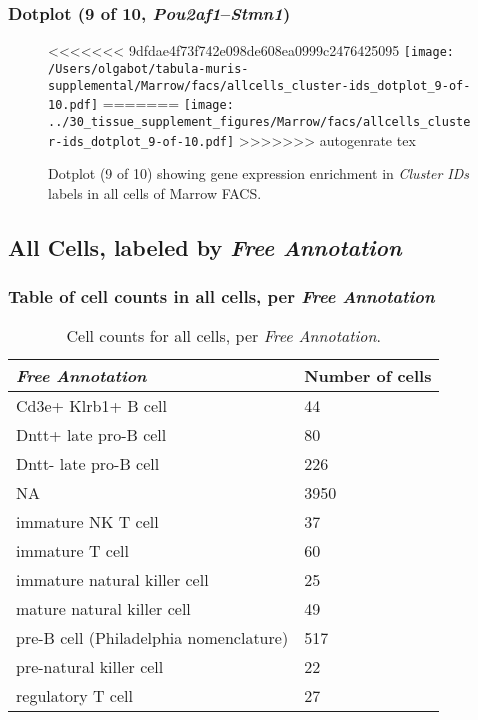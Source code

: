 \clearpage

\subsubsection{Dotplot (9 of 10, \emph{Pou2af1}--\emph{Stmn1})}
\begin{figure}[h]
\centering
<<<<<<< 9dfdae4f73f742e098de608ea0999c2476425095
\texttt{[image: /Users/olgabot/tabula-muris-supplemental/Marrow/facs/allcells\_cluster-ids\_dotplot\_9-of-10.pdf]}
=======
\texttt{[image: ../30\_tissue\_supplement\_figures/Marrow/facs/allcells\_cluster-ids\_dotplot\_9-of-10.pdf]}
>>>>>>> autogenrate tex

\caption{ Dotplot (9 of 10)  showing gene expression enrichment in \emph{Cluster IDs} labels in all cells of Marrow FACS. }
\end{figure}


\clearpage

\subsection{All Cells, labeled by \emph{Free Annotation}}
\subsubsection{Table of cell counts in all cells, per \emph{Free Annotation}}\begin{table}[h]
\centering
\label{my-label}
\begin{tabular}{@{}ll@{}}
\toprule

\emph{Free Annotation}& Number of cells \\ \midrule
Cd3e+ Klrb1+ B cell & 44 \\

Dntt+ late pro-B cell & 80 \\

Dntt- late pro-B cell & 226 \\

NA & 3950 \\

immature NK T cell & 37 \\

immature T cell & 60 \\

immature natural killer cell & 25 \\

mature natural killer cell & 49 \\

pre-B cell (Philadelphia nomenclature) & 517 \\

pre-natural killer cell & 22 \\

regulatory T cell & 27 \\
\bottomrule
\end{tabular}
\caption{Cell counts for all cells, per \emph{Free Annotation}.}
\end{table}

